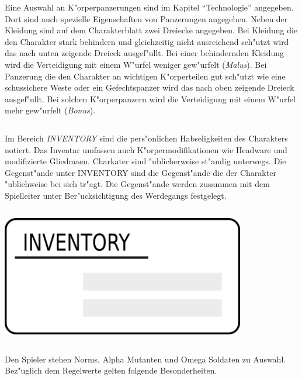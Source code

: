 Eine Auswahl an K"orperpanzerungen sind im Kapitel "`Technologie"' angegeben. Dort sind auch spezielle Eigenschaften von Panzerungen angegeben.  Neben der Kleidung sind auf dem Charakterblatt zwei Dreiecke angegeben. Bei Kleidung die den Charakter stark behindern und gleichzeitig nicht ausreichend sch"utzt wird das nach unten zeigende Dreieck ausgef"ullt. Bei einer behindernden Kleidung wird die Verteidigung mit einem W"urfel weniger gew"urfelt (\emph{Malus}). Bei Panzerung die den Charakter an wichtigen K"orperteilen gut sch"utzt wie eine schussichere Weste oder ein Gefechtspanzer wird das nach oben zeigende Dreieck ausgef"ullt. Bei solchen K"orperpanzern wird die Verteidigung mit einem W"urfel mehr gew"urfelt (\emph{Bonus}).

\begin{column}[l]{0.55}
    Im Bereich \emph{INVENTORY} sind die pers"onlichen Habseligkeiten des Charakters notiert. Das Inventar umfassen auch K"orpermodifikationen wie Headware und modifizierte Gliedma\3en. Charkater sind "ublicherweise st"andig unterwegs. Die Gegenst"ande unter INVENTORY sind die Gegenst"ande die der Charakter "ublichweise bei sich tr"agt. Die Gegenst"ande werden zusammen mit dem Spielleiter unter Ber"ucksichtigung des Werdegangs festgelegt.
\end{column}
\begin{column}[r]{0.45}
    \centering
    \includegraphics[width=0.80\textwidth]{images/character_inventory}
\end{column}
  

Den Spieler stehen Norms, Alpha Mutanten und Omega Soldaten zu Auswahl. Bez"uglich dem Regelwerte gelten folgende Besonderheiten.

